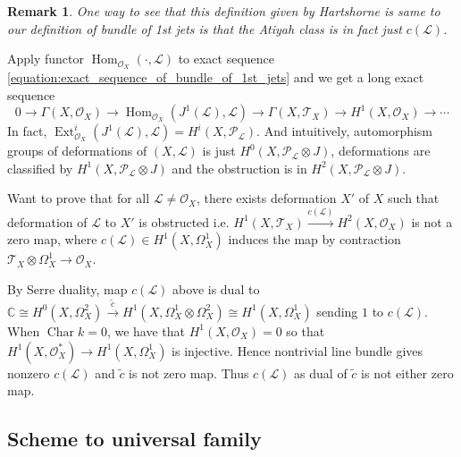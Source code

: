 \documentclass{ctexart}
\newtheorem{remark}{Remark}[section]
\renewcommand{\hom}{\operatorname{Hom}}
\newcommand{\characteristic}{\operatorname{Char}}
\newcommand{\ext}{\operatorname{Ext}}
\begin{document}
\begin{remark}
    One way to see that this definition given by Hartshorne is same to our definition of bundle of 1st jets is that the Atiyah class is in fact just $c(\mathcal{L})$.
\end{remark}
Apply functor $\hom_{\mathcal{O}_{X}}(\cdot, \mathcal{L})$ to exact sequence \ref{equation:exact_sequence_of_bundle_of_1st_jets} and we get a long exact sequence
\begin{equation}
    0 \rightarrow \Gamma(X, \mathcal{O}_{X}) \rightarrow \hom_{\mathcal{O}_{X}}(J^{1}(\mathcal{L}), \mathcal{L}) \rightarrow \Gamma(X, \mathcal{T}_{X}) \rightarrow H^{1}(X, \mathcal{O}_{X}) \rightarrow \cdots
\end{equation}
In fact, $\ext_{\mathcal{O}_{X}}^{i}(J^{1}(\mathcal{L}), \mathcal{L}) = H^{i}(X, \mathcal{P}_{\mathcal{L}})$.
And intuitively, automorphism groups of deformations of $(X, \mathcal{L})$ is just $H^{0}(X, \mathcal{P}_{\mathcal{L}} \otimes J)$,
deformations are classified by $H^{1}(X, \mathcal{P}_{\mathcal{L}} \otimes J)$ and the obstruction is in $H^{2}(X, \mathcal{P}_{\mathcal{L}} \otimes J)$.
\par
Want to prove that for all $\mathcal{L} \neq \mathcal{O}_{X}$, 
there exists deformation $X'$ of $X$ such that deformation of $\mathcal{L}$ to $X'$ is obstructed i.e. $H^{1}(X, \mathcal{T}_{X}) \overset{c(\mathcal{L})}{\rightarrow} H^{2}(X, \mathcal{O}_{X})$ is not a zero map,
where $c(\mathcal{L})\in H^{1}(X, \Omega_{X}^{1})$ induces the map by contraction $\mathcal{T}_{X} \otimes \Omega_{X}^{1} \rightarrow \mathcal{O}_{X}$.
\par
By Serre duality, map $c(\mathcal{L})$ above is dual to $\mathbb{C} \cong H^{0}(X, \Omega_{X}^{2}) \overset{\widetilde{c}}{\rightarrow}H^{1}(X, \Omega_{X}^{1} \otimes \Omega_{X}^{2}) \cong H^{1}(X, \Omega_{X}^{1})$ sending $1$ to $c(\mathcal{L})$.
When $\characteristic k = 0$, we have that $H^{1}(X, \mathcal{O}_{X}) = 0$ so that $H^{1}(X, \mathcal{O}_{X}^{\ast}) \rightarrow H^{1}(X, \Omega_{X}^{1})$ is injective.
Hence nontrivial line bundle gives nonzero $c(\mathcal{L})$ and $\widetilde{c}$ is not zero map.
Thus $c(\mathcal{L})$ as dual of $\widetilde{c}$ is not either zero map.

\subsection{Scheme to universal family}
\label{subsection:Algebraization_of_Formal_Moduli_Scheme_to_universal_family}
\end{document}
